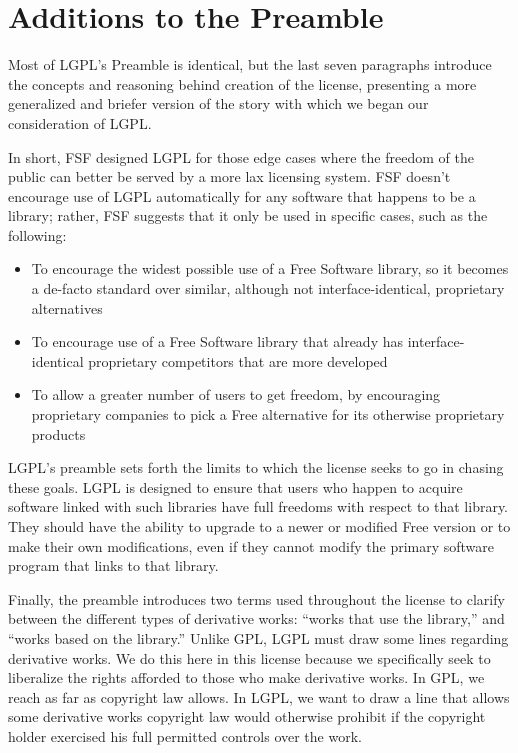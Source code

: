 \documentclass[11pt, letterpaper]{book}
\begin{document}
\section{Additions to the Preamble}

Most of LGPL's Preamble is identical, but the last seven paragraphs
introduce the concepts and reasoning behind creation of the license,
presenting a more generalized and briefer version of the story with which
we began our consideration of LGPL\@.

In short, FSF designed LGPL for those edge cases where the freedom of the
public can better be served by a more lax licensing system. FSF doesn't
encourage use of LGPL automatically for any software that happens to be a
library; rather, FSF suggests that it only be used in specific cases, such
as the following:

\begin{itemize}

\item To encourage the widest possible use of a Free Software library, so
  it becomes a de-facto standard over similar, although not
  interface-identical, proprietary alternatives

\item To encourage use of a Free Software library that already has
  interface-identical proprietary competitors that are more developed

\item To allow a greater number of users to get freedom, by encouraging
  proprietary companies to pick a Free alternative for its otherwise
  proprietary products

\end{itemize}

LGPL's preamble sets forth the limits to which the license seeks to go in
chasing these goals. LGPL is designed to ensure that users who happen to
acquire software linked with such libraries have full freedoms with
respect to that library. They should have the ability to upgrade to a newer
or modified Free version or to make their own modifications, even if they
cannot modify the primary software program that links to that library.

Finally, the preamble introduces two terms used throughout the license to
clarify between the different types of derivative works: ``works that use
the library,'' and ``works based on the library.''  Unlike GPL, LGPL must
draw some lines regarding derivative works. We do this here in this
license because we specifically seek to liberalize the rights afforded to
those who make derivative works. In GPL, we reach as far as copyright law
allows. In LGPL, we want to draw a line that allows some derivative works
copyright law would otherwise prohibit if the copyright holder exercised
his full permitted controls over the work.
\end{document}
